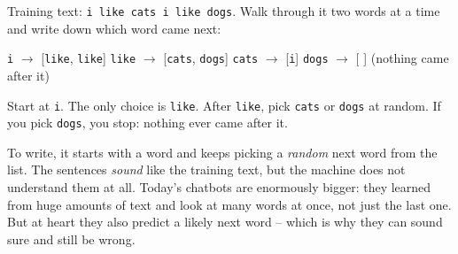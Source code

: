 \begin{center}
\end{center}
\begin{workedexample}
Training text: \texttt{i like cats i like dogs}. Walk through it two words at a time and write down which word came next:
\begin{center}\small
\texttt{i} $\rightarrow$ [\texttt{like}, \texttt{like}] \qquad \texttt{like} $\rightarrow$ [\texttt{cats}, \texttt{dogs}] \qquad \texttt{cats} $\rightarrow$ [\texttt{i}] \qquad \texttt{dogs} $\rightarrow$ [ ] (nothing came after it)
\end{center}
Start at \texttt{i}. The only choice is \texttt{like}. After \texttt{like}, pick \texttt{cats} or \texttt{dogs} at random. If you pick \texttt{dogs}, you stop: nothing ever came after it.
\end{workedexample}
To write, it starts with a word and keeps picking a \emph{random} next word from the list. The sentences \emph{sound} like the training text, but the machine does not understand them at all. Today's chatbots are enormously bigger: they learned from huge amounts of text and look at many words at once, not just the last one. But at heart they also predict a likely next word -- which is why they can sound sure and still be wrong.

